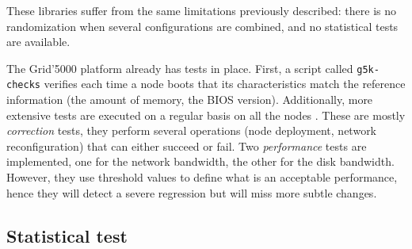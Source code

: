                 These libraries suffer from the same limitations previously described: there is no randomization when
                several configurations are combined, and no statistical tests are available.

                The Grid'5000 platform already has tests in place. First, a script called \texttt{g5k-checks} verifies
                each time a node boots that its characteristics match the reference information (\eg the amount of
                memory, the BIOS version). Additionally, more extensive tests are executed on a regular basis on all the
                nodes \cite{nussbaum:hal-01538682}. These are mostly \emph{correction} tests, they perform several
                operations (\eg node deployment, network reconfiguration) that can either succeed or fail. Two
                \emph{performance} tests are implemented, one for the network bandwidth, the other for the disk
                bandwidth.  However, they use threshold values to define what is an acceptable performance, hence they
                will detect a severe regression but will miss more subtle changes.

        \subsection{Statistical test}%
        \label{sub:statistical_test}

